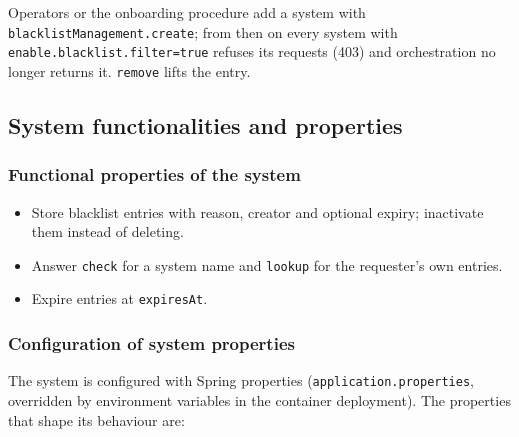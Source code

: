 \documentclass[a4paper]{arrowhead}
\begin{document}
Operators or the onboarding procedure add a system with \texttt{blacklist\allowbreak{}Management.\allowbreak{}create}; from then on every system with \texttt{enable.\allowbreak{}blacklist.\allowbreak{}filter=\allowbreak{}true} refuses its requests (403) and orchestration no longer returns it. \texttt{remove} lifts the entry.

\subsection{System functionalities and properties}
\label{sec:properties}

\subsubsection{Functional properties of the system}

\begin{itemize}
  \item Store blacklist entries with reason, creator and optional expiry; inactivate them instead of deleting.
  \item Answer \texttt{check} for a system name and \texttt{lookup} for the requester's own entries.
  \item Expire entries at \texttt{expiresAt}.
\end{itemize}

\subsubsection{Configuration of system properties}

The system is configured with Spring properties (\texttt{application.properties}, overridden by environment variables in the container deployment). The properties that shape its behaviour are:
\end{document}
